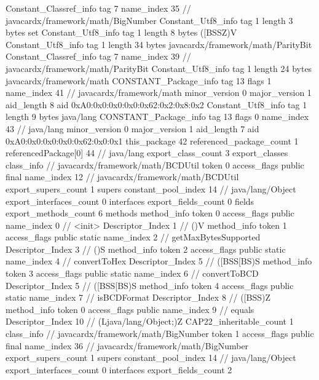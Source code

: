 {{{		}
		Constant_Classref_info {
			tag	7
			name_index	35		// javacardx/framework/math/BigNumber
		}
		Constant_Utf8_info {
			tag	1
			length	3
			bytes	set
		}
		Constant_Utf8_info {
			tag	1
			length	8
			bytes	([BSSZ)V
		}
		Constant_Utf8_info {
			tag	1
			length	34
			bytes	javacardx/framework/math/ParityBit
		}
		Constant_Classref_info {
			tag	7
			name_index	39		// javacardx/framework/math/ParityBit
		}
		Constant_Utf8_info {
			tag	1
			length	24
			bytes	javacardx/framework/math
		}
		CONSTANT_Package_info {
			tag	13
			flags	1
			name_index	41		// javacardx/framework/math
			minor_version	0
			major_version	1
			aid_length	8
			aid	0xA0:0x0:0x0:0x0:0x62:0x2:0x8:0x2
		}
		Constant_Utf8_info {
			tag	1
			length	9
			bytes	java/lang
		}
		CONSTANT_Package_info {
			tag	13
			flags	0
			name_index	43		// java/lang
			minor_version	0
			major_version	1
			aid_length	7
			aid	0xA0:0x0:0x0:0x0:0x62:0x0:0x1
		}
	}
	this_package	42
	referenced_package_count	1
	referencedPackage[0]	44		// java/lang
	export_class_count	3
	export_classes {
		class_info {		// javacardx/framework/math/BCDUtil
			token	0
			access_flags	public final
			name_index	12		// javacardx/framework/math/BCDUtil
			export_supers_count	1
			supers {
				constant_pool_index	14		// java/lang/Object
			}
			export_interfaces_count	0
			interfaces {
			}
			export_fields_count	0
			fields {
			}
			export_methods_count	6
			methods {
				method_info {
					token	0
					access_flags	public
					name_index	0		// <init>
					Descriptor_Index	1		// ()V
				}
				method_info {
					token	1
					access_flags	public static
					name_index	2		// getMaxBytesSupported
					Descriptor_Index	3		// ()S
				}
				method_info {
					token	2
					access_flags	public static
					name_index	4		// convertToHex
					Descriptor_Index	5		// ([BSS[BS)S
				}
				method_info {
					token	3
					access_flags	public static
					name_index	6		// convertToBCD
					Descriptor_Index	5		// ([BSS[BS)S
				}
				method_info {
					token	4
					access_flags	public static
					name_index	7		// isBCDFormat
					Descriptor_Index	8		// ([BSS)Z
				}
				method_info {
					token	0
					access_flags	public
					name_index	9		// equals
					Descriptor_Index	10		// (Ljava/lang/Object;)Z
				}
			}
			CAP22_inheritable_count	1
		}
		class_info {		// javacardx/framework/math/BigNumber
			token	1
			access_flags	public final
			name_index	36		// javacardx/framework/math/BigNumber
			export_supers_count	1
			supers {
				constant_pool_index	14		// java/lang/Object
			}
			export_interfaces_count	0
			interfaces {
			}
			export_fields_count	2
}}}
